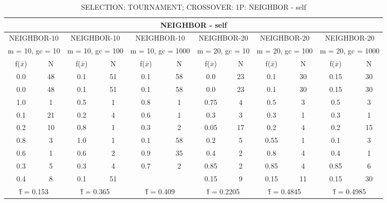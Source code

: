 \begin{table}[H]
	\centering
	\caption{SELECTION: TOURNAMENT; CROSSOVER: 1P: NEIGHBOR - self}
	\begin{adjustbox}{width=1\textwidth}
		\begin{tabular}{ |c|c||c|c||c|c||c|c||c|c||c|c| }
			\hline
			\multicolumn{12}{|c|}{NEIGHBOR - self} \\
			\hline
			\multicolumn{2}{|c||}{NEIGHBOR-10} & \multicolumn{2}{c||}{NEIGHBOR-10} & \multicolumn{2}{c||}{NEIGHBOR-10} & \multicolumn{2}{c||}{NEIGHBOR-20} & \multicolumn{2}{c||}{NEIGHBOR-20} & \multicolumn{2}{c|}{NEIGHBOR-20}\\
			\hline
			\multicolumn{2}{|c||}{m = 10, gc = 10} & \multicolumn{2}{c||}{m = 10, gc = 100} & \multicolumn{2}{c||}{m = 10, gc = 1000} & \multicolumn{2}{c||}{m = 20, gc = 10} & \multicolumn{2}{c||}{m = 20, gc = 100} & \multicolumn{2}{c|}{m = 20, gc = 1000}\\
			\hline
			f($\bar{x}$) & N & f($\bar{x}$) & N & f($\bar{x}$) & N & f($\bar{x}$) & N & f($\bar{x}$) & N & f($\bar{x}$) & N\\
			\hline
			\hline
			0.0 & 48 & 0.1 & 51 & 0.1 & 58 & 0.0 & 23 & 0.1 & 30 & 0.15 & 30\\
			\hline
			0.0 & 48 & 0.1 & 51 & 0.1 & 58 & 0.0 & 23 & 0.1 & 30 & 0.15 & 30\\
			1.0 & 1 & 0.5 & 1 & 0.8 & 1 & 0.75 & 4 & 0.5 & 3 & 0.5 & 3\\
			0.1 & 21 & 0.2 & 4 & 0.6 & 1 & 0.3 & 3 & 0.3 & 1 & 0.3 & 1\\
			0.2 & 10 & 0.8 & 1 & 0.3 & 2 & 0.05 & 17 & 0.2 & 4 & 0.2 & 15\\
			0.8 & 3 & 1.0 & 1 & 0.1 & 58 & 0.2 & 5 & 0.55 & 1 & 0.1 & 3\\
			0.6 & 1 & 0.6 & 2 & 0.9 & 35 & 0.4 & 2 & 0.8 & 4 & 0.4 & 1\\
			0.3 & 5 & 0.3 & 4 & 0.7 & 2 & 0.85 & 2 & 0.85 & 4 & 0.85 & 6\\
			0.4 & 8 & 0.1 & 51 &   &   & 0.15 & 9 & 0.15 & 11 & 0.15 & 30\\
			\hline
			\multicolumn{2}{|c||}{\^{f} = 0.153} & \multicolumn{2}{c||}{\^{f} = 0.365} & \multicolumn{2}{c||}{\^{f} = 0.409} & \multicolumn{2}{c||}{\^{f} = 0.2205} & \multicolumn{2}{c||}{\^{f} = 0.4845} & \multicolumn{2}{c|}{\^{f} = 0.4985}\\
			\hline
		\end{tabular}
	\end{adjustbox}
\end{table}
